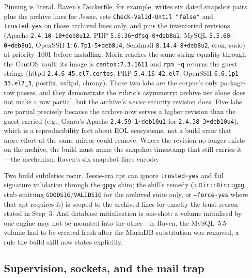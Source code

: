 \documentclass[3p,twocolumn,authoryear]{elsarticle}
\begin{document}
Pinning is literal. Raven's Dockerfile, for example, writes six dated
snapshot pairs plus the archive lines for Jessie, sets
\texttt{Check-Valid-Until "false"} and \texttt{trusted=yes} on those
archived lines only, and pins the inventoried revisions
(Apache \texttt{2.4.10-10+deb8u12}, PHP \texttt{5.6.36+dfsg-0+deb8u1},
MySQL \texttt{5.5.60-0+deb8u1}, OpenSSH \texttt{1:6.7p1-5+deb8u4},
Sendmail \texttt{8.14.4-8+deb8u2}, cron, sudo) at priority~1001 before
installing. Moria reaches the same string equality through the CentOS
vault: its image is \texttt{centos:7.3.1611} and \texttt{rpm -q}
returns the guest strings (httpd \texttt{2.4.6-45.el7.centos},
PHP \texttt{5.4.16-42.el7}, OpenSSH \texttt{6.6.1p1-33.el7\_3}, postfix,
vsftpd, chrony). Those two labs are the corpus's only package-row
passes, and they demonstrate the rubric's asymmetry: archive use alone
does not make a row partial, but the archive's \emph{newer} security
revision does. Five labs are partial precisely because the archive now
serves a higher revision than the guest carried (e.g., Gaara's Apache
\texttt{2.4.59-1\textasciitilde deb10u1} for \texttt{2.4.38-3+deb10u4}),
which is a reproducibility fact about EOL ecosystems, not a build
error that more effort at the same mirror could remove. Where the
revision no longer exists on the archive, the build must name the
snapshot timestamp that still carries it---the mechanism Raven's six
snapshot lines encode.

Two build subtleties recur. Jessie-era apt can ignore
\texttt{trusted=yes} and fail signature validation through the
\texttt{gpgv} shim; the skill's remedy (a \texttt{Dir::Bin::gpg} stub
emitting \texttt{GOODSIG}/\texttt{VALIDSIG} for the archived suite
only, or \texttt{--force-yes} where that apt requires it) is scoped to
the archived lines for exactly the trust reason stated in Step~3.
And database initialisation is one-shot: a volume initialised by one
engine may not be mounted into the other---in Raven, the MySQL~5.5
volume had to be created fresh after the MariaDB substitution was
removed, a rule the build skill now states explicitly.

\subsection{Supervision, sockets, and the mail trap}
\end{document}
